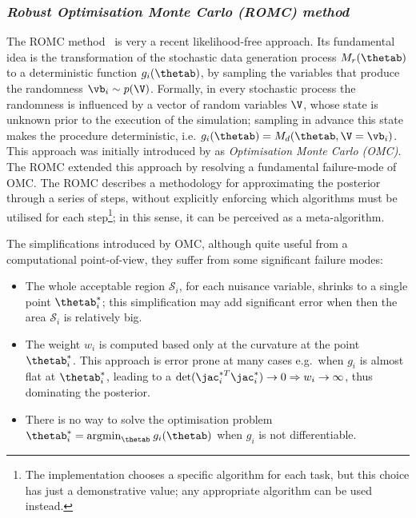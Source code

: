 \subsubsection*{\textit{Robust Optimisation Monte Carlo (ROMC) method}}

The ROMC method~\cite{Ikonomov2019} is very a recent likelihood-free
approach. Its fundamental idea is the transformation of the stochastic
data generation process $M_r(\thetab)$ to a deterministic function
$g_i(\thetab)$, by sampling the variables that produce the randomness
$\vb_i \sim p(\V)$. Formally, in every stochastic process the
randomness is influenced by a vector of random variables $\V$, whose
state is unknown prior to the execution of the simulation; sampling in
advance this state makes the procedure deterministic, i.e.
$g_i(\thetab) = M_d(\thetab, \V=\vb_i)$. This approach was initially
introduced by \cite{Meeds2015} as \textit{Optimisation Monte Carlo
  (OMC)}. The ROMC extended this approach by resolving a fundamental
failure-mode of OMC. The ROMC describes a methodology for
approximating the posterior through a series of steps, without
explicitly enforcing which algorithms must be utilised for each
step\footnote{The implementation chooses a specific algorithm for each
  task, but this choice has just a demonstrative value; any
  appropriate algorithm can be used instead.}; in this sense, it can
be perceived as a meta-algorithm.


The simplifications introduced by OMC, although quite useful from a
computational point-of-view, they suffer from some significant failure modes:

\begin{itemize}
\item The whole acceptable region $\mathcal{S}_i$, for each nuisance variable,
  shrinks to a single point $\thetab_i^*$; this simplification may add
  significant error when then the area $\mathcal{S}_i$ is relatively big.
\item The weight $w_i$ is computed based only at the curvature at the
  point $\thetab_i^*$. This approach is error prone at many cases
  e.g.\ when $g_i$ is almost flat at $\thetab_i^*$, leading to a
  $\text{det}(\jac_i^{*T}\jac_i^*) \rightarrow 0 \Rightarrow w_i
  \rightarrow \infty$, thus dominating the posterior.
\item There is no way to solve the optimisation problem
  $\thetab_i^* = \text{argmin}_{\thetab} \: g_i(\thetab)$ when $g_i$
  is not differentiable.
\end{itemize}


